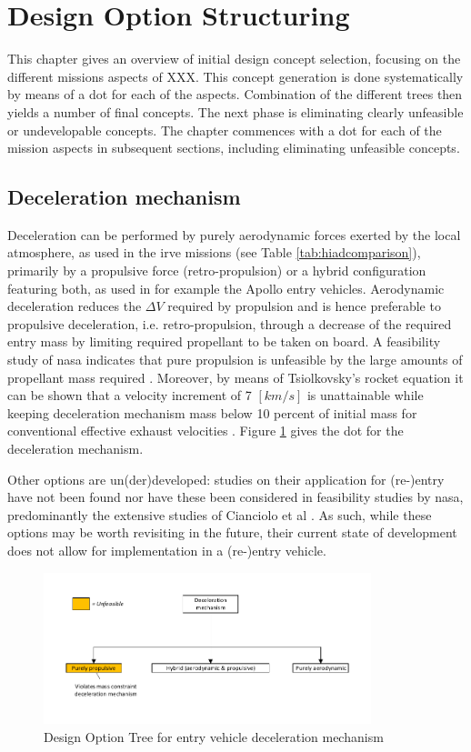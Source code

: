 \section{Design Option Structuring} \label{ch:design}
This chapter gives an overview of initial design concept selection, focusing on the different missions aspects of XXX. This concept generation is done systematically by means of a \gls{dot} for each of the aspects. Combination of the different trees then yields a number of final concepts. The next phase is eliminating clearly unfeasible or undevelopable concepts. The chapter commences with a \gls{dot} for each of the mission aspects in subsequent sections, including eliminating unfeasible concepts.

\subsection{Deceleration mechanism}
Deceleration can be performed by purely aerodynamic forces exerted by the local atmosphere, as used in the \gls{irve} missions (see Table \ref{tab:hiadcomparison}), primarily by a propulsive force (retro-propulsion) or a hybrid configuration featuring both, as used in for example the Apollo entry vehicles. Aerodynamic deceleration reduces the $\Delta V$ required by propulsion and is hence preferable to propulsive deceleration, i.e. retro-propulsion, through a decrease of the required entry mass by limiting required propellant to be taken on board. A feasibility study of \gls{nasa} indicates that pure propulsion is unfeasible by the large amounts of propellant mass required \cite{Cianciolo2010}. Moreover, by means of Tsiolkovsky's rocket equation it can be shown that a velocity increment of 7 $[km/s]$ is unattainable while keeping deceleration mechanism mass below 10 percent of initial mass for conventional effective exhaust velocities \cite{Wertz2011}. Figure \ref{fig:dotdelmech} gives the \gls{dot} for the deceleration mechanism.

Other options are un(der)developed: studies on their application for (re-)entry have not been found nor have these been considered in feasibility studies by \gls{nasa}, predominantly the extensive studies of Cianciolo et al \cite{Cianciolo2010}. As such, while these options may be worth revisiting in the future, their current state of development does not allow for implementation in a (re-)entry vehicle.

\begin{figure}[H]
\centering
\includegraphics[width = 0.85\textwidth]{Figure/DOT_decelerationmechanism.pdf}
\caption{Design Option Tree for entry vehicle deceleration mechanism}
\label{fig:dotdelmech}
\end{figure}

